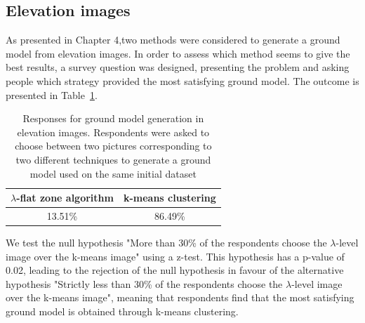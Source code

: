 \documentclass{kththesis}
\begin{document}
\subsection{Elevation images}
As presented in Chapter 4,two methods were considered to generate a ground model from elevation images. In order to assess which method seems to give the best results, a survey question was designed, presenting the problem and asking people which strategy provided the most satisfying ground model. The outcome is presented in Table~\ref{table:elev_survey}.

\begin{table}[H]
\centering
\begin{tabular}{|c| c|}
\hline
	$\lambda$-flat zone algorithm & k-means clustering \\
	\hline
	13.51\% & 86.49\% \\
	\hline

\end{tabular}
\caption{Responses for ground model generation in elevation images. Respondents were asked to choose between two pictures corresponding to two different techniques to generate a ground model used on the same initial dataset}
\label{table:elev_survey}
\end{table}
We test the null hypothesis "More than 30\% of the respondents 
choose the $\lambda$-level image over the k-means image" using a z-test. This hypothesis has a p-value of 0.02, leading to the rejection of the null hypothesis in favour of the alternative hypothesis "Strictly less than 30\% of the respondents choose the $\lambda$-level image over the k-means image", meaning that respondents find that the most satisfying ground model is obtained through k-means clustering.
\end{document}
